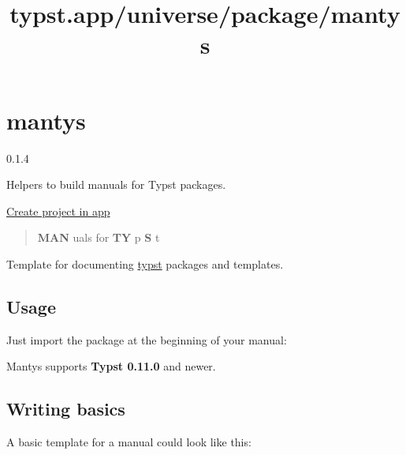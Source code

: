 \title{typst.app/universe/package/mantys}

\label{banner}
\label{template-thumbnail}

\section{mantys}\label{mantys}

{ 0.1.4 }

Helpers to build manuals for Typst packages.

\href{/app?template=mantys&version=0.1.4}{Create project in app}

\label{readme}
\begin{quote}
\textbf{MAN} uals for \textbf{TY} p \textbf{S} t
\end{quote}

Template for documenting \href{https://github.com/typst/typst}{typst}
packages and templates.

\subsection{Usage}\label{usage}

Just import the package at the beginning of your manual:

\begin{Shaded}
\begin{Highlighting}[]
\end{Highlighting}
\end{Shaded}

Mantys supports \textbf{Typst 0.11.0} and newer.

\subsection{Writing basics}\label{writing-basics}

A basic template for a manual could look like this:

